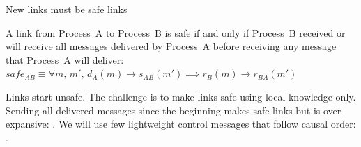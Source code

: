 \documentclass[10pt, xcolor={usenames, dvipsnames}]{beamer}
\newcommand{\cmark}{\ding{51}}
\newcommand{\xmark}{\ding{55}}
\newcommand{\YES}[1]{\textcolor{green}{#1}}
\newcommand{\NO}[1]{\textcolor{red}{#1}}
\begin{document}
  



\begin{frame}{New links must be safe links}

  \begin{definition}
    A link from Process~A to Process~B is safe if and only if Process~B received
    or will receive all messages delivered by Process~A before receiving any
    message that Process~A will deliver:
    $safe_{AB} \equiv \forall m,\, m',\, d_A(m) \rightarrow s_{AB}(m') \implies
    r_B(m) \rightarrow r_{BA}(m')$
  \end{definition}


    \begin{center}
      
    \end{center}


  Links start unsafe. The challenge is to make links safe using local knowledge
  only. Sending all delivered messages since the beginning makes safe links but
  is over-expansive: \NO{\xmark}. We will use few lightweight control messages
  that follow causal order: \YES{\cmark}.

\end{frame}
\end{document}
